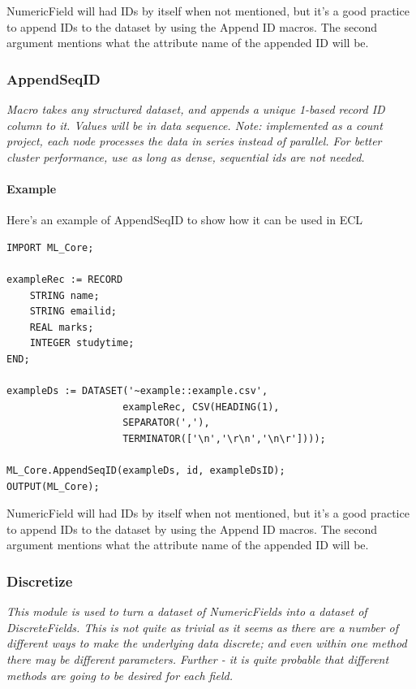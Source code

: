 NumericField will had IDs by itself when not mentioned, but it's a good practice to append IDs to the dataset by using the Append ID macros. The second argument mentions what the attribute name of the appended ID will be.

\subsubsection{AppendSeqID}\label{mlcore:appendseqid}

\textit{Macro takes any structured dataset, and appends a unique 1-based record ID column to it. Values will be in data sequence. Note: implemented as a count project, each node processes the data in series instead of parallel. For better cluster performance, use  as long as dense, sequential ids are not needed.}

\paragraph{Example}

Here's an example of AppendSeqID to show how it can be used in ECL

\begin{lstlisting}
IMPORT ML_Core;

exampleRec := RECORD
    STRING name;
    STRING emailid;
    REAL marks;
    INTEGER studytime;
END;

exampleDs := DATASET('~example::example.csv', 
                    exampleRec, CSV(HEADING(1),
                    SEPARATOR(','),
                    TERMINATOR(['\n','\r\n','\n\r'])));

ML_Core.AppendSeqID(exampleDs, id, exampleDsID);
OUTPUT(ML_Core);
\end{lstlisting}

NumericField will had IDs by itself when not mentioned, but it's a good practice to append IDs to the dataset by using the Append ID macros. The second argument mentions what the attribute name of the appended ID will be.

\subsubsection{Discretize}\label{mlcore:discretize}

\textit{This module is used to turn a dataset of NumericFields into a dataset of DiscreteFields. This is not quite as trivial as it seems as there are a number of different ways to make the underlying data discrete; and even within one method there may be different parameters. Further - it is quite probable that different methods are going to be desired for each field.}

